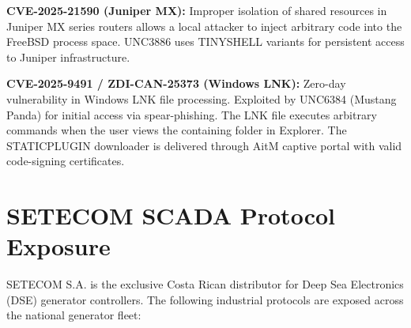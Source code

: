 \documentclass[11pt,a4paper]{article}
\begin{document}
\textbf{CVE-2025-21590 (Juniper MX):} Improper isolation of shared resources in Juniper MX series routers allows a local attacker to inject arbitrary code into the FreeBSD process space. UNC3886 uses TINYSHELL variants for persistent access to Juniper infrastructure.

\textbf{CVE-2025-9491 / ZDI-CAN-25373 (Windows LNK):} Zero-day vulnerability in Windows LNK file processing. Exploited by UNC6384 (Mustang Panda) for initial access via spear-phishing. The LNK file executes arbitrary commands when the user views the containing folder in Explorer. The STATICPLUGIN downloader is delivered through AitM captive portal with valid code-signing certificates.

\section{SETECOM SCADA Protocol Exposure}

SETECOM S.A. is the exclusive Costa Rican distributor for Deep Sea Electronics (DSE) generator controllers. The following industrial protocols are exposed across the national generator fleet:
\end{document}
